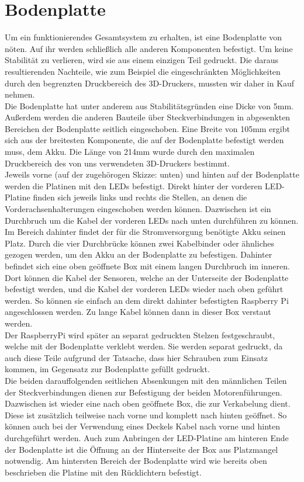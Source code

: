 \section{Bodenplatte}
Um ein funktionierendes Gesamtsystem zu erhalten, ist eine Bodenplatte von nöten. Auf ihr werden schließlich alle anderen Komponenten befestigt. Um keine Stabilität zu verlieren, wird sie aus einem einzigen Teil gedruckt. Die daraus resultierenden Nachteile, wie zum Beispiel die eingeschränkten Möglichkeiten durch den begrenzten Druckbereich des 3D-Druckers, mussten wir daher in Kauf nehmen.\\
Die Bodenplatte hat unter anderem aus Stabilitätsgründen eine Dicke von 5mm. Außerdem werden die anderen Bauteile über Steckverbindungen in abgesenkten Bereichen der Bodenplatte seitlich eingeschoben. Eine Breite von 105mm ergibt sich aus der breitesten Komponente, die auf der Bodenplatte befestigt werden muss, dem Akku. Die Länge von 214mm wurde durch den maximalen Druckbereich des von uns verwendeten 3D-Druckers bestimmt.\\
Jeweils vorne (auf der zugehörogen Skizze: unten) und hinten auf der Bodenplatte werden die Platinen mit den LEDs befestigt. Direkt hinter der vorderen LED-Platine finden sich jeweils links und rechts die Stellen, an denen die Vorderachsenhalterungen eingeschoben werden können. Dazwischen ist ein Durchbruch um die Kabel der vorderen LEDs nach unten durchführen zu können.\\ 
Im Bereich dahinter findet der für die Stromversorgung benötigte Akku seinen Platz. Durch die vier Durchbrücke können zwei Kabelbinder oder ähnliches gezogen werden, um den Akku an der Bodenplatte zu befestigen. Dahinter befindet sich eine oben geöffnete Box mit einem langen Durchbruch im inneren. Dort können die Kabel der Sensoren, welche an der Unterseite der Bodenplatte befestigt werden, und die Kabel der vorderen LEDs wieder nach oben geführt werden. So können sie einfach an dem direkt dahinter befestigten Raspberry Pi angeschlossen werden. Zu lange Kabel können dann in dieser Box verstaut werden.\\
Der RaspberryPi wird später an separat gedruckten Stelzen festgeschraubt, welche mit der Bodenplatte verklebt werden. Sie werden separat gedruckt, da auch diese Teile aufgrund der Tatsache, dass hier Schrauben zum Einsatz kommen, im Gegensatz zur Bodenplatte gefüllt gedruckt.\\
Die beiden darauffolgenden seitlichen Absenkungen mit den männlichen Teilen der Steckverbindungen dienen zur Befestigung der beiden Motorenführungen. Dazwischen ist wieder eine nach oben geöffnete Box, die zur Verkabelung dient. Diese ist zusätzlich teilweise nach vorne und komplett nach hinten geöffnet. So können auch bei der Verwendung eines Deckels Kabel nach vorne und hinten durchgeführt werden. Auch zum Anbringen der LED-Platine am hinteren Ende der Bodenplatte ist die Öffnung an der Hinterseite der Box aus Platzmangel notwendig. Am hintersten Bereich der Bodenplatte wird wie bereits oben beschrieben die Platine mit den Rücklichtern befestigt.
